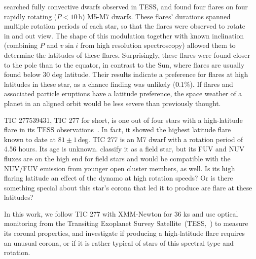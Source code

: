 \documentclass[twocolumn]{aastex631}
\begin{document}
\citet{ilin2021giant} searched fully convective dwarfs observed in TESS, and found four flares on four rapidly rotating ($P<10\,$h) M5-M7 dwarfs. These flares' durations spanned multiple rotation periods of each star, so that the flares were observed to rotate in and out view. The shape of this modulation together with known inclination (combining $P$ and $v \sin i$ from high resolution spectroscopy) allowed them to determine the latitudes of these flares. Surprisingly, these flares were found closer to the pole than to the equator, in contrast to the Sun, where flares are usually found below 30 deg latitude. Their results indicate a preference for flares at high latitudes in these star, as a chance finding was unlikely ($0.1\%$). If flares and associated particle eruptions have a latitude preference, the space weather of a planet in an aligned orbit would be less severe than previously thought. %


TIC 277539431, TIC 277 for short, is one out of four stars with a high-latitude flare in its TESS observations~\citep{ilin2021giant}. In fact, it showed the highest latitude flare known to date at $81\pm1\,$deg. TIC 277 is an M7 dwarf with a rotation period of 4.56 hours. Its age is unknown. \citet{schneider2018hazmat} classify it as a field star, but its FUV and NUV fluxes are on the high end for field stars and would be compatible with the NUV/FUV emission from younger open cluster members, as well. 
Is its high flaring latitude an effect of the dynamo at high rotation speeds? Or is there something special about this star's corona that led it to produce are flare at these latitudes? 

In this work, we follow TIC 277 with XMM-Newton for 36 ks and use optical monitoring from the Transiting Exoplanet Survey Satellite~(TESS,~\citealt{ricker2015transiting}) to measure its coronal properties, and investigate if producing a high-latitude flare requires an unusual corona, or if it is rather typical of stars of this spectral type and rotation.
\end{document}
